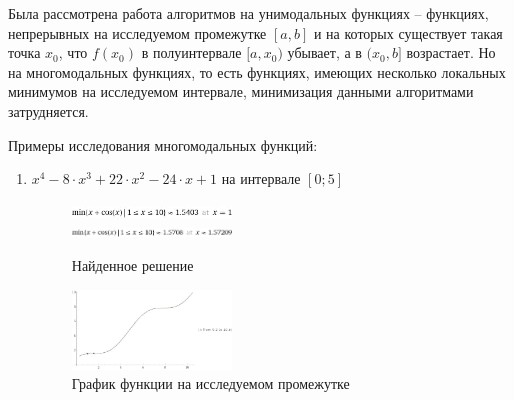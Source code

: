 \documentclass[12pt]{article}
\begin{document}
Была рассмотрена работа алгоритмов на унимодальных функциях -- функциях, непрерывных на исследуемом промежутке $[a, b]$ и на которых существует такая точка $x_0$, что $f(x_0)$ в полуинтервале $[a, x_0)$ убывает, а в $(x_0, b]$ возрастает. Но на многомодальных функциях, то есть функциях, имеющих несколько локальных минимумов на исследуемом интервале, минимизация данными алгоритмами затрудняется.

Примеры исследования многомодальных функций:

\begin{enumerate}
\item $x^4 - 8 \cdot x^3 + 22 \cdot x^2 - 24 \cdot x + 1$ на интервале $[0; 5]$ 

\begin{figure}[h]
\centering
\includegraphics[width=0.4\textwidth]{images/2loc1.jpg} \\
\includegraphics[width=0.4\textwidth]{images/2loc2.jpg}
\caption{Найденное решение}
\end{figure}

\begin{figure}[h]
\centering
\includegraphics[width=0.4\textwidth]{images/2loc3.jpg}
\caption{График функции на исследуемом промежутке}
\end{figure}


\end{enumerate}
\end{document}
